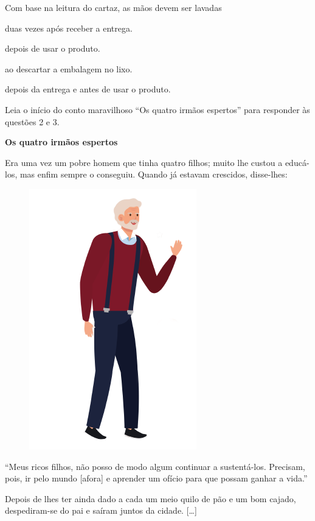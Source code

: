 Com base na leitura do cartaz, as mãos devem ser lavadas

\begin{escolha}
\item duas vezes após receber a entrega.

\item depois de usar o produto.

\item ao descartar a embalagem no lixo.

\item depois da entrega e antes de usar o produto.
\end{escolha}

Leia o início do conto maravilhoso ``Os quatro irmãos espertos'' para responder às questões 2 e 3.

\begin{myquote}
\textbf{Os quatro irmãos espertos}

Era uma vez um pobre homem que tinha quatro filhos; muito lhe custou a
educá-los, mas enfim sempre o conseguiu. Quando já estavam crescidos,
disse-lhes:

\begin{figure}
\includegraphics[width=.3\textwidth]{./media/image23x.png}
\end{figure}

``Meus ricos filhos, não posso de modo algum continuar a sustentá-los.
Precisam, pois, ir pelo mundo [afora] e aprender um ofício para que possam
ganhar a vida.''

Depois de lhes ter ainda dado a cada um meio quilo de pão e um bom
cajado, despediram-se do pai e saíram juntos da cidade. {[}\ldots{}{]}


\end{myquote}
\enlargethispage{2\baselineskip}


